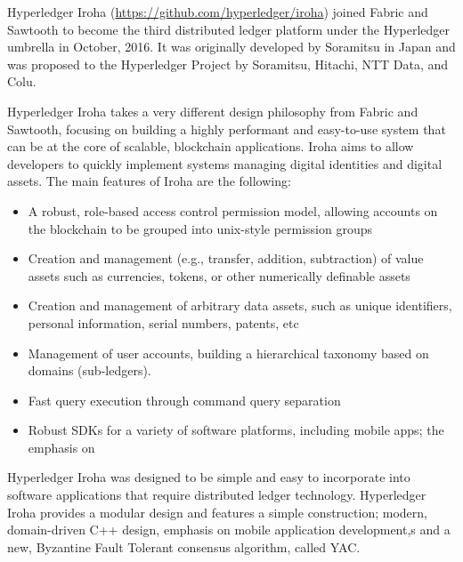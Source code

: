 Hyperledger Iroha (\url{https://github.com/hyperledger/iroha}) joined Fabric and Sawtooth to become the third distributed ledger platform under the Hyperledger umbrella in October, 2016. It was originally developed by Soramitsu in Japan and was proposed to the Hyperledger Project by Soramitsu, Hitachi, NTT Data, and Colu.

Hyperledger Iroha takes a very different design philosophy from Fabric and Sawtooth, focusing on building a highly performant and easy-to-use system that can be at the core of scalable, blockchain applications. Iroha aims to allow developers to quickly implement systems managing digital identities and digital assets. The main features of Iroha are the following:

\begin{itemize}
\item A robust, role-based access control permission model, allowing accounts on the blockchain to be grouped into unix-style permission groups
\item Creation and management (e.g., transfer, addition, subtraction) of value assets such as currencies, tokens, or other numerically definable assets
\item Creation and management of arbitrary data assets, such as unique identifiers, personal information, serial numbers, patents, etc
\item Management of user accounts, building a hierarchical taxonomy based on domains (sub-ledgers).
\item Fast query execution through command query separation
\item Robust SDKs for a variety of software platforms, including mobile apps; the emphasis on 
\end{itemize} 

Hyperledger Iroha was designed to be simple and easy to incorporate into software applications that require distributed ledger technology. Hyperledger Iroha provides a modular design and features a simple construction; modern, domain-driven C++ design, emphasis on mobile application development,s and a new, Byzantine Fault Tolerant consensus algorithm, called YAC.

